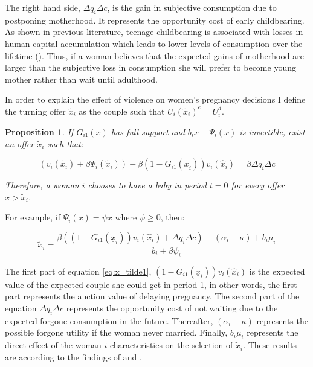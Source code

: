 \documentclass[a4paper,10pt,twocolumn,preprint,3p,authoryear]{elsarticle}
\newtheorem{prop}{Proposition}
\begin{document}
The right hand side, $\Delta q_{i}\Delta c$, is the gain in subjective consumption due to postponing motherhood. It represents the opportunity cost of early childbearing. As shown in previous literature, teenage childbearing is associated with losses in human capital accumulation which leads to lower levels of consumption over the lifetime (\citet{KearneyLevine2012}). Thus, if a woman believes that the expected gains of motherhood are larger than the subjective loss in consumption she will prefer to become young mother rather than wait until adulthood. 

In order to explain the effect of violence on women's pregnancy decisions I define the turning offer $\tilde{x}_{i}$ as the couple such that $U_{i}\left( \tilde{x}_{i} \right)^{e}=U_{i}^{d}$.

\begin{prop}
	If $G_{i1}\left( x \right)$ has full support and $b_{i}x + \Psi_{i}\left( x \right)$ is invertible, exist an offer $\tilde{x}_{i}$ such that:

			\begin{equation}
				\left(v_{i}\left(\tilde{x}_{i}\right) + \beta\Psi_{i}\left( \tilde{x}_{i} \right)\right)-\beta\left(1-G_{i1}\left( \underline{x}_{i} \right)\right)v_{i}\left(\hat{x}_{i}\right) = \beta\Delta q_{i} \Delta c
				\label{eq:TurningOffer}
			\end{equation} 
	\label{prop:TurningOffer}

	Therefore, a woman $i$ chooses to have a baby in period $t=0$ for every offer $x > \tilde{x}_{i}$. 
\end{prop}

For example, if $\Psi_{i}\left( x \right)=\psi x$ where $\psi \geq 0$, then:

\begin{equation}
	\tilde{x}_{i} =\frac{\beta\left(\left(1-G_{i1}\left( \underline{x}_{i} \right)\right) v_{i}\left(\hat{x}_{i}\right) + \Delta q_{i} \Delta c \right) - \left( \alpha_{i} - \kappa \right) + b_{i}\mu_{i}}{b_{i} + \beta \psi_{i}} 
	\label{eq:x_tilde1}
\end{equation}

The first part of equation \ref{eq:x_tilde1}, $\left(1-G_{i1}\left( \underline{x}_{i} \right)\right) v_{i}\left(\hat{x}_{i}\right)$ is the expected value of the expected couple she could get in period 1, in other words, the first part represents the auction value of delaying pregnancy. The second part of the equation $\Delta q_{i}\Delta c$ represents the opportunity cost of not waiting due to the expected forgone consumption in the future.  Thereafter, $\left( \alpha_{i} - \kappa \right)$ represents the possible forgone utility if the woman never married. Finally, $b_{i}\mu_{i}$ represents the direct effect of the woman $i$ characteristics on the selection of $\tilde{x}_{i}$. These results are according to the findings of \citet{BlackburnBloomNeumark1993} and \citet{ErmischPevalin2004}.
\end{document}
